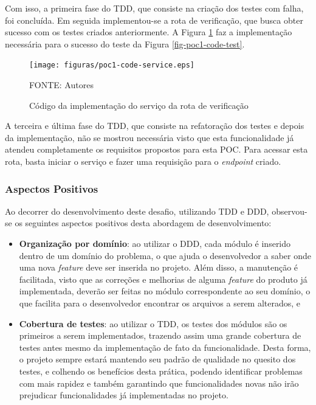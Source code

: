 Com isso, a primeira fase do TDD, que consiste na criação dos testes com falha, foi concluída. Em seguida
implementou-se a rota de verificação, que busca obter sucesso com os testes criados anteriormente. A Figura \ref{fig-poc1-code-service} 
faz a implementação necessária para o sucesso do teste da Figura \ref{fig-poc1-code-test}.

\begin{figure}[h]
	\centering
  \caption{Código da implementação do serviço da rota de verificação}
	\texttt{[image: figuras/poc1-code-service.eps]}
	\parbox{\linewidth}{\centering FONTE: Autores}
	\label{fig-poc1-code-service}
\end{figure}

A terceira e última fase do TDD, que consiste na refatoração dos testes e depois da implementação, não se mostrou necessária 
visto que esta funcionalidade já atendeu completamente os requisitos propostos para esta POC. Para acessar 
esta rota, basta iniciar o serviço e fazer uma requisição para o \textit{endpoint} criado.


\subsubsection{Aspectos Positivos}

Ao decorrer do desenvolvimento deste desafio, utilizando TDD e DDD, observou-se os seguintes aspectos 
positivos desta abordagem de desenvolvimento:

\begin{itemize}
  \item\textbf{Organização por domínio}: ao utilizar o DDD, cada módulo é inserido dentro de um domínio do problema, 
  o que ajuda o desenvolvedor a saber onde uma nova \textit{feature} deve ser inserida no projeto. 
  Além disso, a manutenção é facilitada, visto que as correções e melhorias de alguma \textit{feature} do 
  produto já implementada, deverão ser feitas no módulo correspondente ao seu domínio, o que facilita para 
  o desenvolvedor encontrar os arquivos a serem alterados, e
  
  \item\textbf{Cobertura de testes}: ao utilizar o TDD, os testes dos módulos são os primeiros a serem 
  implementados, trazendo assim uma grande cobertura de testes antes mesmo da implementação de fato da 
  funcionalidade. Desta forma, o projeto sempre estará mantendo seu padrão de qualidade no quesito dos 
  testes, e colhendo os benefícios desta prática, podendo identificar problemas com mais rapidez e 
  também garantindo que funcionalidades novas não irão prejudicar funcionalidades já implementadas no projeto.
\end{itemize}


